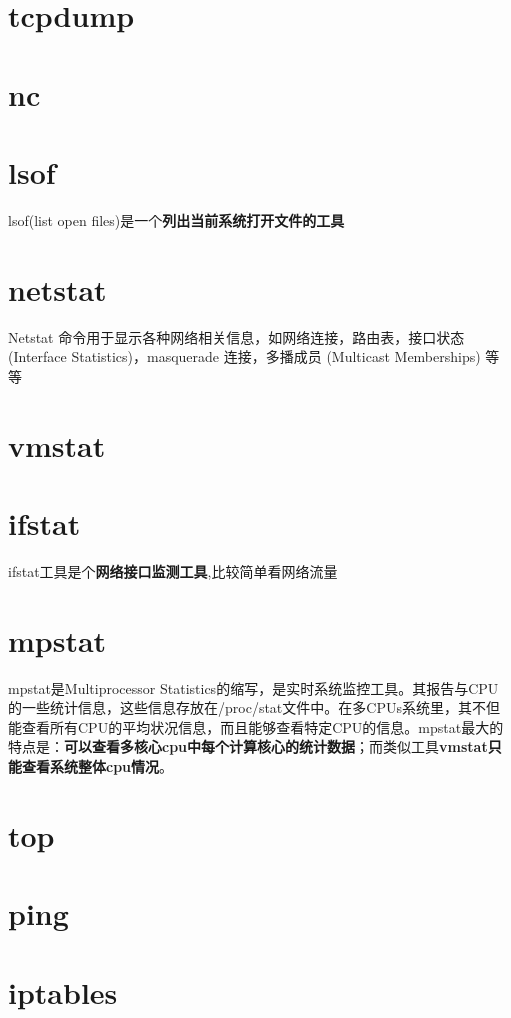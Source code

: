 \documentclass[UTF8,a4paper,12pt]{ctexbook}
\begin{document}
	\section{tcpdump}
	
	\section{nc}
	
	\section{lsof}lsof(list open files)是一个\textbf{列出当前系统打开文件的工具}
	
	\section{netstat}Netstat 命令用于显示各种网络相关信息，如网络连接，路由表，接口状态 (Interface Statistics)，masquerade 连接，多播成员 (Multicast Memberships) 等等
	
	\section{vmstat}
	
	\section{ifstat}ifstat工具是个\textbf{网络接口监测工具},比较简单看网络流量
	
	\section{mpstat}mpstat是Multiprocessor Statistics的缩写，是实时系统监控工具。其报告与CPU的一些统计信息，这些信息存放在/proc/stat文件中。在多CPUs系统里，其不但能查看所有CPU的平均状况信息，而且能够查看特定CPU的信息。mpstat最大的特点是：\textbf{可以查看多核心cpu中每个计算核心的统计数据}；而类似工具\textbf{vmstat只能查看系统整体cpu情况}。
	
	\section{top}
	
	\section{ping}
	
	\section{iptables}
	
\end{document}
